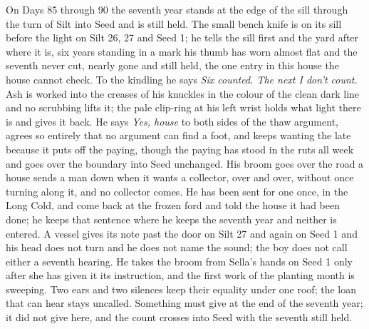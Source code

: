 \documentclass{design/chronicle}
\begin{document}
{On Days 85 through 90 the seventh year stands at the edge of the sill through the turn of Silt into Seed and is still held. The small bench knife is on its sill before the light on Silt 26, 27 and Seed 1; he tells the sill first and the yard after where it is, six years standing in a mark his thumb has worn almost flat and the seventh never cut, nearly gone and still held, the one entry in this house the house cannot check. To the kindling he says \emph{Six counted. The next I don’t count.} Ash is worked into the creases of his knuckles in the colour of the clean dark line and no scrubbing lifts it; the pale clip-ring at his left wrist holds what light there is and gives it back. He says \emph{Yes, house} to both sides of the thaw argument, agrees so entirely that no argument can find a foot, and keeps wanting the late because it puts off the paying, though the paying has stood in the ruts all week and goes over the boundary into Seed unchanged. His broom goes over the road a house sends a man down when it wants a collector, over and over, without once turning along it, and no collector comes. He has been sent for one once, in the Long Cold, and come back at the frozen ford and told the house it had been done; he keeps that sentence where he keeps the seventh year and neither is entered. A vessel gives its note past the door on Silt 27 and again on Seed 1 and his head does not turn and he does not name the sound; the boy does not call either a seventh hearing. He takes the broom from Sella’s hands on Seed 1 only after she has given it its instruction, and the first work of the planting month is sweeping. Two ears and two silences keep their equality under one roof; the loan that can hear stays uncalled. Something must give at the end of the seventh year; it did not give here, and the count crosses into Seed with the seventh still held.

}
\end{document}
